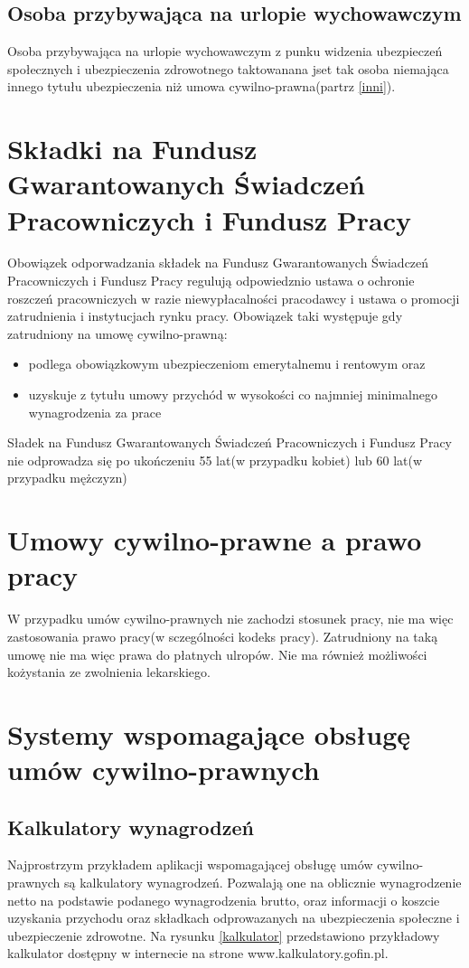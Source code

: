 \subsection{Osoba przybywająca na urlopie wychowawczym}
Osoba przybywająca na urlopie wychowawczym z punku widzenia ubezpieczeń społecznych i ubezpieczenia zdrowotnego taktowanana jset tak osoba niemająca innego tytułu ubezpieczenia niż umowa cywilno-prawna(partrz \ref{inni}).

\section{Składki na Fundusz Gwarantowanych Świadczeń Pracowniczych i Fundusz Pracy}
Obowiązek odporwadzania składek na Fundusz Gwarantowanych Świadczeń Pracowniczych i Fundusz Pracy regulują odpowiedznio ustawa o ochronie roszczeń pracowniczych w razie niewypłacalności pracodawcy\cite{TODO} i ustawa o promocji zatrudnienia i instytucjach rynku pracy. Obowiązek taki występuje gdy zatrudniony na umowę cywilno-prawną:
\begin{itemize}
	\item podlega obowiązkowym ubezpieczeniom emerytalnemu i rentowym oraz
	\item uzyskuje z tytułu umowy przychód w wysokości co najmniej minimalnego wynagrodzenia za prace
\end{itemize}
Sładek na Fundusz Gwarantowanych Świadczeń Pracowniczych i Fundusz Pracy nie odprowadza się po ukończeniu 55 lat(w przypadku kobiet) lub 60 lat(w przypadku mężczyzn)

\section[Umowy cywilno-prawne a prawo pracy][Umowy cywilno-prawne a prawo pracy]{Umowy cywilno-prawne a prawo pracy}
W przypadku umów cywilno-prawnych nie zachodzi stosunek pracy, nie ma więc zastosowania prawo pracy(w sczególności kodeks pracy). Zatrudniony na taką umowę nie ma więc prawa do płatnych ulropów. Nie ma również możliwości kożystania ze zwolnienia lekarskiego.

\section[Systemy wspomagające obsługę umów cywilno-prawnych][Systemy wspomagające obsługę umów cywilno-prawnych]{Systemy wspomagające obsługę umów cywilno-prawnych}

\subsection[Kalkulatory wynagrodzeń][Kalkulatory wynagrodzeń]{Kalkulatory wynagrodzeń}
Najprostrzym przykładem aplikacji wspomagającej obsługę umów cywilno-prawnych są kalkulatory wynagrodzeń. Pozwalają one na oblicznie wynagrodzenie netto na podstawie podanego wynagrodzenia brutto, oraz informacji o koszcie uzyskania przychodu oraz składkach odprowazanych na ubezpieczenia społeczne i ubezpieczenie zdrowotne. Na rysunku \ref{kalkulator} przedstawiono przykładowy kalkulator dostępny w internecie na strone www.kalkulatory.gofin.pl.

